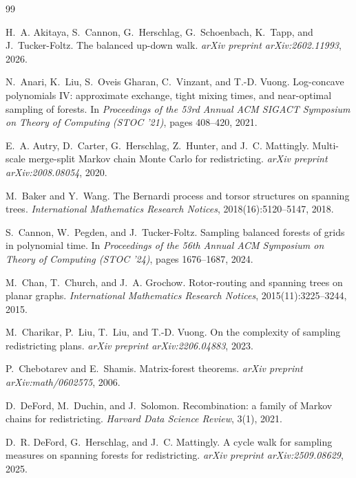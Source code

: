 \documentclass[11pt]{article}
\begin{document}
\begin{thebibliography}{99}

H.~A. Akitaya, S.~Cannon, G.~Herschlag, G.~Schoenbach, K.~Tapp, and
  J.~Tucker-Foltz.
\newblock The balanced up-down walk.
\newblock \emph{arXiv preprint arXiv:2602.11993}, 2026.

N.~Anari, K.~Liu, S.~{Oveis Gharan}, C.~Vinzant, and T.-D. Vuong.
\newblock Log-concave polynomials {IV}: approximate exchange, tight mixing
  times, and near-optimal sampling of forests.
\newblock In \emph{Proceedings of the 53rd Annual ACM SIGACT Symposium on
  Theory of Computing (STOC '21)}, pages 408--420, 2021.

E.~A. Autry, D.~Carter, G.~Herschlag, Z.~Hunter, and J.~C. Mattingly.
\newblock Multi-scale merge-split {M}arkov chain {M}onte {C}arlo for
  redistricting.
\newblock \emph{arXiv preprint arXiv:2008.08054}, 2020.

M.~Baker and Y.~Wang.
\newblock The {B}ernardi process and torsor structures on spanning trees.
\newblock \emph{International Mathematics Research Notices},
  2018(16):5120--5147, 2018.

S.~Cannon, W.~Pegden, and J.~Tucker-Foltz.
\newblock Sampling balanced forests of grids in polynomial time.
\newblock In \emph{Proceedings of the 56th Annual ACM Symposium on Theory of
  Computing (STOC '24)}, pages 1676--1687, 2024.

M.~Chan, T.~Church, and J.~A. Grochow.
\newblock Rotor-routing and spanning trees on planar graphs.
\newblock \emph{International Mathematics Research Notices},
  2015(11):3225--3244, 2015.

M.~Charikar, P.~Liu, T.~Liu, and T.-D. Vuong.
\newblock On the complexity of sampling redistricting plans.
\newblock \emph{arXiv preprint arXiv:2206.04883}, 2023.

P.~Chebotarev and E.~Shamis.
\newblock Matrix-forest theorems.
\newblock \emph{arXiv preprint arXiv:math/0602575}, 2006.

D.~DeFord, M.~Duchin, and J.~Solomon.
\newblock Recombination: a family of {M}arkov chains for redistricting.
\newblock \emph{Harvard Data Science Review}, 3(1), 2021.

D.~R. DeFord, G.~Herschlag, and J.~C. Mattingly.
\newblock A cycle walk for sampling measures on spanning forests for
  redistricting.
\newblock \emph{arXiv preprint arXiv:2509.08629}, 2025.


\end{thebibliography}
\end{document}

